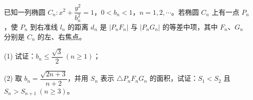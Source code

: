 \begin{question}
已知一列椭圆 \(C_n:x^2+\dfrac{y^2}{b_n^2}=1\)，\(0<b_n<1\)，\(n=1,2,\cdots\)。若椭圆 \(C_n\) 上有一点 \(P_n\)，使 \(P_n\) 到右准线 \(l_n\) 的距离 \(d_n\) 是 \(|P_nF_n|\) 与 \(|P_nG_n|\) 的等差中项，其中 \(F_n、G_n\) 分别是 \(C_n\) 的左、右焦点。
\nopagebreak[4]
\begin{center}\end{center}
\nopagebreak[4]
(1) 试证：\(b_n\leq\dfrac{\sqrt3}{2}\ (n\geq1)\)；

(2) 取 \(b_n=\dfrac{\sqrt{2n+3}}{n+2}\)，并用 \(S_n\) 表示 \(\triangle P_nF_nG_n\) 的面积，试证：\(S_1<S_2\) 且 \(S_n>S_{n+1}\ (n\geq3)\)。

\end{question}